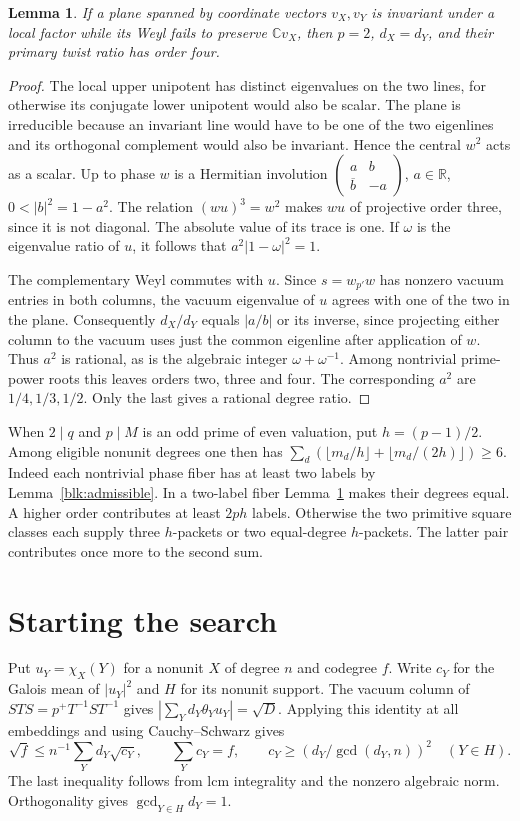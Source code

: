 \documentclass[11pt]{amsart}
\numberwithin{equation}{section}
\newtheorem{lemma}[theorem]{Lemma}
\begin{document}
\begin{lemma}\label{blk:two}
If a plane spanned by coordinate vectors $v_X,v_Y$ is invariant under a local factor while its Weyl fails to preserve $\mathbb C v_X$, then $p=2$, $d_X=d_Y$, and their primary twist ratio has order four.
\end{lemma}
\begin{proof}
The local upper unipotent has distinct eigenvalues on the two lines, for otherwise its conjugate lower unipotent would also be scalar. The plane is irreducible because an invariant line would have to be one of the two eigenlines and its orthogonal complement would also be invariant. Hence the central $w^2$ acts as a scalar. Up to phase $w$ is a Hermitian involution $\left(\begin{smallmatrix}a&b\\\overline b&-a\end{smallmatrix}\right)$, $a\in\mathbb R$, $0<|b|^2=1-a^2$. The relation $(wu)^3=w^2$ makes $wu$ of projective order three, since it is not diagonal. The absolute value of its trace is one. If $\omega$ is the eigenvalue ratio of $u$, it follows that $a^2|1-\omega|^2=1$.

The complementary Weyl commutes with $u$. Since $s=w_{p'}w$ has nonzero vacuum entries in both columns, the vacuum eigenvalue of $u$ agrees with one of the two in the plane. Consequently $d_X/d_Y$ equals $|a/b|$ or its inverse, since projecting either column to the vacuum uses just the common eigenline after application of $w$. Thus $a^2$ is rational, as is the algebraic integer $\omega+\omega^{-1}$. Among nontrivial prime-power roots this leaves orders two, three and four. The corresponding $a^2$ are $1/4,1/3,1/2$. Only the last gives a rational degree ratio.
\end{proof}

When $2\mid q$ and $p\mid M$ is an odd prime of even valuation, put $h=(p-1)/2$. Among eligible nonunit degrees one then has $\sum_d(\lfloor m_d/h\rfloor+\lfloor m_d/(2h)\rfloor)\ge6$. Indeed each nontrivial phase fiber has at least two labels by Lemma~\ref{blk:admissible}. In a two-label fiber Lemma~\ref{blk:two} makes their degrees equal. A higher order contributes at least $2ph$ labels. Otherwise the two primitive square classes each supply three $h$-packets or two equal-degree $h$-packets. The latter pair contributes once more to the second sum.

\section{Starting the search}\label{sec:small}
Put $u_Y=\chi_X(Y)$ for a nonunit $X$ of degree $n$ and codegree
$f$. Write $c_Y$ for the Galois mean of $|u_Y|^2$ and $H$ for its
nonunit support. The vacuum column of $STS=p^+T^{-1}ST^{-1}$ gives
$|\sum_Y d_Y\theta_Yu_Y|=\sqrt D$. Applying this identity at all
embeddings and using Cauchy--Schwarz gives
\begin{equation}\label{st}
 \sqrt f\le n^{-1}\sum_Y d_Y\sqrt{c_Y},\qquad
 \sum_Y c_Y=f,\qquad
 c_Y\ge (d_Y/\gcd(d_Y,n))^2\quad(Y\in H).
\end{equation}
The last inequality follows from lcm integrality and the nonzero
algebraic norm. Orthogonality gives $\gcd_{Y\in H}d_Y=1$.
\end{document}
